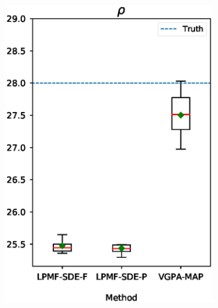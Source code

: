 \begin{frame}[t]
\begin{figure}
\begin{subfigure}{0.24\textwidth}
            \includegraphics[width=\linewidth]{graphics/lorenz-63-parameters-rho-boxplot}
            \label{fig-lorenz-63-parameters-rho-boxplot}
        \end{subfigure}
        \begin{subfigure}{0.24\textwidth}

\end{subfigure}
\end{figure}
\end{frame}
